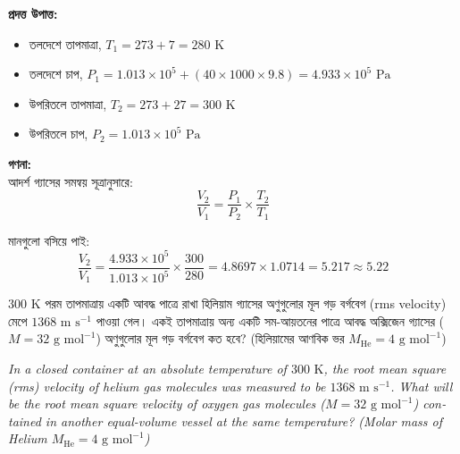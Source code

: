 \documentclass[12pt, a4paper]{article}
\begin{document}
\begin{tcolorbox}[solutionbox={সমাধান (Solution)}]
    \noindent
    \textbf{প্রদত্ত উপাত্ত:}
    \begin{itemize}[leftmargin=1.5em, itemsep=0.2em]
        \item তলদেশে তাপমাত্রা, $T_1 = 273 + 7 = 280\text{ K}$
        \item তলদেশে চাপ, $P_1 = 1.013 \times 10^5 + (40 \times 1000 \times 9.8) = 4.933 \times 10^5\text{ Pa}$
        \item উপরিতলে তাপমাত্রা, $T_2 = 273 + 27 = 300\text{ K}$
        \item উপরিতলে চাপ, $P_2 = 1.013 \times 10^5\text{ Pa}$
    \end{itemize}

    \vspace{0.6em}
    \noindent\textbf{গণনা:} \\
    আদর্শ গ্যাসের সমন্বয় সূত্রানুসারে:
    \[ \frac{V_2}{V_1} = \frac{P_1}{P_2} \times \frac{T_2}{T_1} \]
    
    মানগুলো বসিয়ে পাই:
    \[ \frac{V_2}{V_1} = \frac{4.933 \times 10^5}{1.013 \times 10^5} \times \frac{300}{280} = 4.8697 \times 1.0714 = 5.217 \approx \mathbf{5.22} \]
\end{tcolorbox}


\begin{tcolorbox}[questionbox={প্রশ্ন (Question) 14}]
    \noindent
    $300\text{ K}$ পরম তাপমাত্রায় একটি আবদ্ধ পাত্রে রাখা হিলিয়াম গ্যাসের অণুগুলোর মূল গড় বর্গবেগ (rms velocity) মেপে $1368\text{ m s}^{-1}$ পাওয়া গেল। একই তাপমাত্রায় অন্য একটি সম-আয়তনের পাত্রে আবদ্ধ অক্সিজেন গ্যাসের ($M = 32\text{ g mol}^{-1}$) অণুগুলোর মূল গড় বর্গবেগ কত হবে? (হিলিয়ামের আণবিক ভর $M_{\text{He}} = 4\text{ g mol}^{-1}$)
    
    \vspace{0.8em}
    \begin{english}
    \noindent\textit{\color{darkgray}
    In a closed container at an absolute temperature of $300\text{ K}$, the root mean square (rms) velocity of helium gas molecules was measured to be $1368\text{ m s}^{-1}$. What will be the root mean square velocity of oxygen gas molecules ($M = 32\text{ g mol}^{-1}$) contained in another equal-volume vessel at the same temperature? (Molar mass of Helium $M_{\text{He}} = 4\text{ g mol}^{-1}$)
    }
    \end{english}
\end{tcolorbox}
\end{document}

